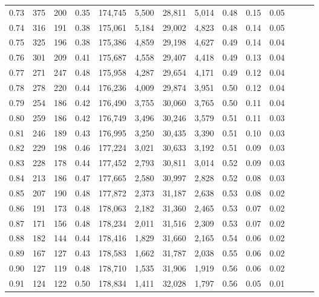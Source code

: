 \begin{tabular}{rrrrrrrrrrrrrr}
0.73 &    375 &  200 &  0.35 &  174,745 &    5,500 &  28,811 &   5,014 &  0.48 &  0.15 &      0.05 \\
0.74 &    316 &  191 &  0.38 &  175,061 &    5,184 &  29,002 &   4,823 &  0.48 &  0.14 &      0.05 \\
0.75 &    325 &  196 &  0.38 &  175,386 &    4,859 &  29,198 &   4,627 &  0.49 &  0.14 &      0.04 \\
0.76 &    301 &  209 &  0.41 &  175,687 &    4,558 &  29,407 &   4,418 &  0.49 &  0.13 &      0.04 \\
0.77 &    271 &  247 &  0.48 &  175,958 &    4,287 &  29,654 &   4,171 &  0.49 &  0.12 &      0.04 \\
0.78 &    278 &  220 &  0.44 &  176,236 &    4,009 &  29,874 &   3,951 &  0.50 &  0.12 &      0.04 \\
0.79 &    254 &  186 &  0.42 &  176,490 &    3,755 &  30,060 &   3,765 &  0.50 &  0.11 &      0.04 \\
0.80 &    259 &  186 &  0.42 &  176,749 &    3,496 &  30,246 &   3,579 &  0.51 &  0.11 &      0.03 \\
0.81 &    246 &  189 &  0.43 &  176,995 &    3,250 &  30,435 &   3,390 &  0.51 &  0.10 &      0.03 \\
0.82 &    229 &  198 &  0.46 &  177,224 &    3,021 &  30,633 &   3,192 &  0.51 &  0.09 &      0.03 \\
0.83 &    228 &  178 &  0.44 &  177,452 &    2,793 &  30,811 &   3,014 &  0.52 &  0.09 &      0.03 \\
0.84 &    213 &  186 &  0.47 &  177,665 &    2,580 &  30,997 &   2,828 &  0.52 &  0.08 &      0.03 \\
0.85 &    207 &  190 &  0.48 &  177,872 &    2,373 &  31,187 &   2,638 &  0.53 &  0.08 &      0.02 \\
0.86 &    191 &  173 &  0.48 &  178,063 &    2,182 &  31,360 &   2,465 &  0.53 &  0.07 &      0.02 \\
0.87 &    171 &  156 &  0.48 &  178,234 &    2,011 &  31,516 &   2,309 &  0.53 &  0.07 &      0.02 \\
0.88 &    182 &  144 &  0.44 &  178,416 &    1,829 &  31,660 &   2,165 &  0.54 &  0.06 &      0.02 \\
0.89 &    167 &  127 &  0.43 &  178,583 &    1,662 &  31,787 &   2,038 &  0.55 &  0.06 &      0.02 \\
0.90 &    127 &  119 &  0.48 &  178,710 &    1,535 &  31,906 &   1,919 &  0.56 &  0.06 &      0.02 \\
0.91 &    124 &  122 &  0.50 &  178,834 &    1,411 &  32,028 &   1,797 &  0.56 &  0.05 &      0.01 \\

\end{tabular}
